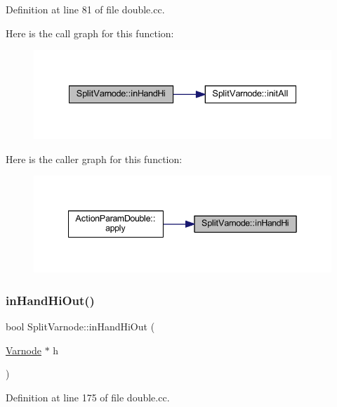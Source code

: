 Definition at line 81 of file double.\+cc.

Here is the call graph for this function\+:
\nopagebreak
\begin{figure}[H]
\begin{center}
\leavevmode
\includegraphics[width=335pt]{class_split_varnode_aeabc6a2a9163112cf04c79aa2dfe31f8_cgraph}
\end{center}
\end{figure}
Here is the caller graph for this function\+:
\nopagebreak
\begin{figure}[H]
\begin{center}
\leavevmode
\includegraphics[width=342pt]{class_split_varnode_aeabc6a2a9163112cf04c79aa2dfe31f8_icgraph}
\end{center}
\end{figure}
\mbox{\label{class_split_varnode_a5f0c6ee63f23f5ac06c6b38e805289ae}} 
\subsubsection{\texorpdfstring{inHandHiOut()}{inHandHiOut()}}
{\footnotesize\ttfamily bool Split\+Varnode\+::in\+Hand\+Hi\+Out (\begin{DoxyParamCaption}\item[{\mbox{\hyperlink{class_varnode}{Varnode}} $\ast$}]{h }\end{DoxyParamCaption})}



Definition at line 175 of file double.\+cc.

